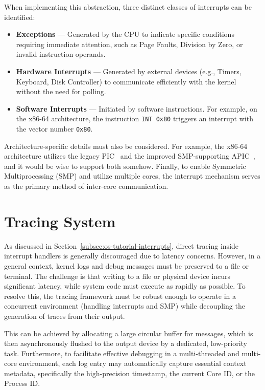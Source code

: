 \documentclass[a4paper,10pt,twoside]{report}
\theoremstyle{definition}
\begin{document}
When implementing this abstraction, three distinct classes of interrupts can be identified:

\begin{itemize}
    \item \textbf{Exceptions} --- Generated by the CPU to indicate specific conditions requiring immediate attention, such as Page Faults, Division by Zero, or invalid instruction operands.
    \item \textbf{Hardware Interrupts} --- Generated by external devices (e.g., Timers, Keyboard, Disk Controller) to communicate efficiently with the kernel without the need for polling.
    \item \textbf{Software Interrupts} --- Initiated by software instructions. For example, on the x86-64 architecture, the instruction \texttt{INT 0x80} triggers an interrupt with the vector number \texttt{0x80}.
\end{itemize}

Architecture-specific details must also be considered. For example, the x86-64 architecture utilizes the legacy PIC~\cite{osdev-pic} and the improved SMP-supporting APIC~\cite{osdev-apic}, and it would be wise to support both somehow. 
Finally, to enable Symmetric Multiprocessing (SMP) and utilize multiple cores, the interrupt mechanism serves as the primary method of inter-core communication.

\section{Tracing System}
\label{sec:tracing}

As discussed in Section~\ref{subsec:os-tutorial-interrupts}, direct tracing inside interrupt handlers is generally discouraged due to latency concerns. However, in a general context, kernel logs and debug messages must be preserved to a file or terminal. The challenge is that writing to a file or physical device incurs significant latency, while system code must execute as rapidly as possible. To resolve this, the tracing framework must be robust enough to operate in a concurrent environment (handling interrupts and SMP) while decoupling the generation of traces from their output. 

This can be achieved by allocating a large circular buffer for messages, which is then asynchronously flushed to the output device by a dedicated, low-priority task. Furthermore, to facilitate effective debugging in a multi-threaded and multi-core environment, each log entry may automatically capture essential context metadata, specifically the high-precision timestamp, the current Core ID, or the Process ID.
\end{document}
